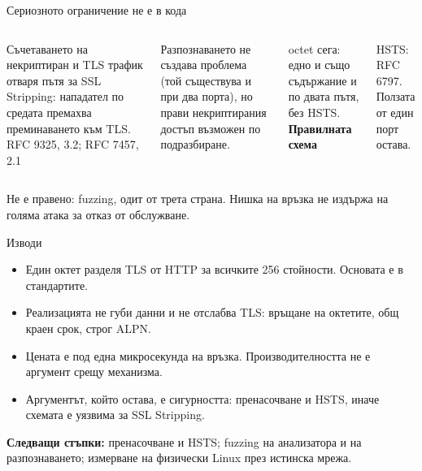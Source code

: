 \documentclass[aspectratio=169, 11pt]{beamer}
\newcommand{\code}[1]{{\ttfamily #1}}
\newcommand{\src}[1]{{\color{muted}\scriptsize #1}}
\begin{document}
\begin{frame}{Сериозното ограничение не е в кода}
\begin{columns}[T]
Съчетаването на некриптиран и TLS трафик отваря пътя за \alert{SSL Stripping}: нападател
по средата премахва преминаването към TLS. \src{RFC 9325, 3.2; RFC 7457, 2.1}\par\medskip
Разпознаването не създава проблема (той съществува и при два порта), но прави
некриптирания достъп възможен по подразбиране.\par\medskip
\code{octet} сега: едно и също съдържание и по двата пътя, без HSTS.
\textbf{Правилната схема}\par\smallskip
{}\par\smallskip
{\scriptsize HSTS: RFC 6797. Ползата от един порт остава.\par}
\end{columns}
\vspace{0.8em}
{\small Не е правено: fuzzing, одит от трета страна. Нишка на връзка не издържа на голяма атака за отказ от обслужване.\par}
\end{frame}

\begin{frame}{Изводи}
\begin{itemize}
\item Един октет разделя TLS от HTTP за всичките 256 стойности. Основата е в стандартите.
\item Реализацията не губи данни и не отслабва TLS: връщане на октетите, общ краен срок, строг ALPN.
\item Цената е под една микросекунда на връзка. Производителността не е аргумент срещу механизма.
\item Аргументът, който остава, е сигурността: пренасочване и HSTS, иначе схемата е уязвима за SSL Stripping.
\end{itemize}
\vspace{0.8em}
\textbf{Следващи стъпки:} пренасочване и HSTS; fuzzing на анализатора и на разпознаването;
измерване на физически Linux през истинска мрежа.
\end{frame}
\end{document}
